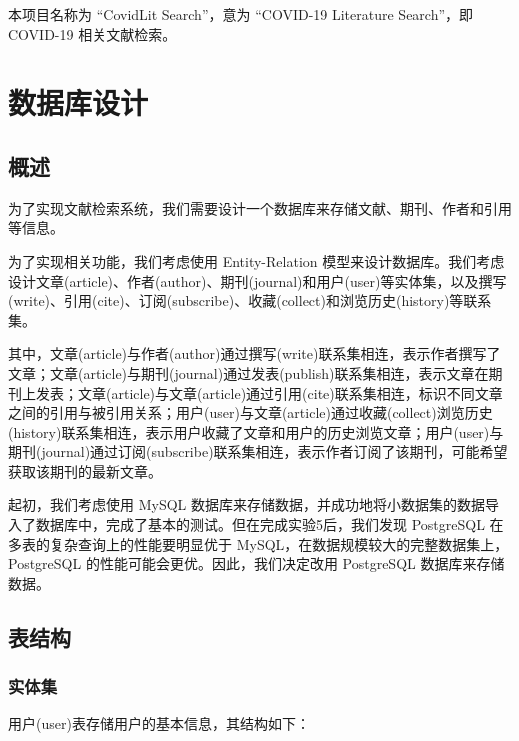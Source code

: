 \documentclass[UTF8,openany]{ctexbook}
\begin{document}
本项目名称为 ``CovidLit Search''，意为 ``COVID-19 Literature Search''，即 COVID-19 相关文献检索。

\chapter{数据库设计}

\section{概述}
\label{sec:overviewOfDatabaseDesign}

为了实现文献检索系统，我们需要设计一个数据库来存储文献、期刊、作者和引用等信息。

为了实现相关功能，我们考虑使用 Entity-Relation 模型来设计数据库。我们考虑设计文章(article)、作者(author)、期刊(journal)和用户(user)等实体集，以及撰写(write)、引用(cite)、订阅(subscribe)、收藏(collect)和浏览历史(history)等联系集。

其中，文章(article)与作者(author)通过撰写(write)联系集相连，表示作者撰写了文章；文章(article)与期刊(journal)通过发表(publish)联系集相连，表示文章在期刊上发表；文章(article)与文章(article)通过引用(cite)联系集相连，标识不同文章之间的引用与被引用关系；用户(user)与文章(article)通过收藏(collect)浏览历史(history)联系集相连，表示用户收藏了文章和用户的历史浏览文章；用户(user)与期刊(journal)通过订阅(subscribe)联系集相连，表示作者订阅了该期刊，可能希望获取该期刊的最新文章。

起初，我们考虑使用 MySQL 数据库来存储数据，并成功地将小数据集的数据导入了数据库中，完成了基本的测试。但在完成实验5后，我们发现 PostgreSQL 在多表的复杂查询上的性能要明显优于 MySQL，在数据规模较大的完整数据集上，PostgreSQL 的性能可能会更优。因此，我们决定改用 PostgreSQL 数据库来存储数据。

\section{表结构}

\subsection{实体集}

用户(user)表存储用户的基本信息，其结构如下：
\end{document}
